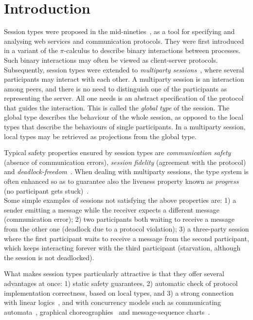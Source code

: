 
\section{Introduction}
\label{sec:intro}

Session types were proposed in the mid-nineties~\cite{THK94,HVK98}, as
a tool for specifying and analysing web services and communication
protocols. They were first introduced in a variant of the
$\pi$-calculus to describe binary interactions between processes.
Such binary interactions may often be viewed as client-server 
protocols. 
%
Subsequently, session types were extended to {\em multiparty
  sessions}~\cite{CHY08,CHY16}, where several participants may
interact with each other.  A multiparty session is an interaction
among peers, and there is no need to distinguish one of the
participants as representing the server.  All one needs is an abstract
specification of the protocol that guides the interaction.  This is
called the \emph{global type} of the session. The global type
describes the behaviour of the whole session, as opposed to the local
types that describe the behaviours of single participants. In a
multiparty session, local types may be retrieved as projections from
the global type.
%

Typical safety properties ensured by session types are
\emph{communication safety} (absence of communication errors),
\emph{session fidelity} (agreement with the protocol) and
\emph{deadlock-freedom}~\cite{CHY16}.  When dealing with multiparty
sessions, the type system is often enhanced so as to guarantee also
the liveness property known as \emph{progress} (no participant gets
stuck)~\cite{H2016}.
\\
Some simple examples of sessions not satisfying the above properties
are: 1) a sender emitting a message while the receiver expects a
different message (communication error); 2) two participants both
waiting to receive a message from the other one (deadlock due to a
protocol violation); 3) a three-party session where the first
participant waits to receive a message from the second participant,
which keeps interacting forever with the third participant
(starvation, although the session is not deadlocked).


What makes session types particularly attractive is that they offer
several advantages at once: 1) static safety guarantees, 2) automatic
check of protocol implementation correctness, based on local types,
and 3) a strong connection with linear
logics~\cite{CP10,TCP11,Wadler14,PCPT14,CPT16}, and with concurrency
models such as communicating automata~\cite{DY12}, graphical
choreographies~\cite{LTY15,TuostoG18} and message-sequence
charts~\cite{CHY16}.


